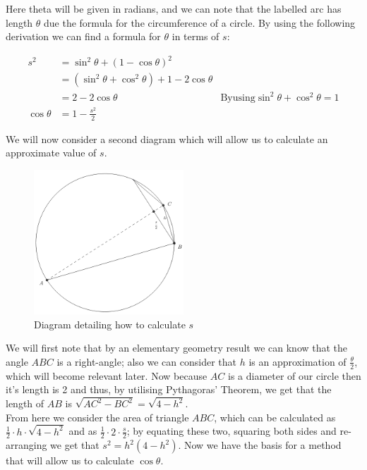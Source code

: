 Here theta will be given in radians, and we can note that the labelled arc has length \(\theta\) due the formula for the circumference of a circle. By using the following derivation we can find a formula for \(\theta\) in terms of \(s\):

\begin{displaymath}
\begin{align*}
	s^2 &= \sin^2\theta + (1 - \cos\theta)^2\\
	    &= (\sin^2\theta + \cos^2\theta) + 1 - 2\cos\theta\\
		&= 2 - 2 \cos\theta 
			&\mathrm{By using } \sin^2\theta + \cos^2\theta = 1\\
	\cos\theta &= 1 - \frac{s^2}{2}
\end{align*}
\end{displaymath}

We will now consider a second diagram which will allow us to calculate an approximate value of \(s\).

\begin{figure}[!ht]
	\label{FIG_"Geometric Trig 2"}
	\caption{Diagram detailing how to calculate \(s\)}
	\centering
	\includegraphics[width=0.5\textwidth]{"./Diagrams/Geometric Trig Diagram 2"}
\end{figure}

We will first note that by an elementary geometry result we can know that the angle \(ABC\) is a right-angle; also we can consider that \(h\) is an approximation of \(\tfrac{\theta}{2}\), which will become relevant later. Now because \(AC\) is a diameter of our circle then it's length is 2 and thus, by utilising Pythagoras' Theorem, we get that the length of \(AB\) is \(\sqrt{AC^2 - BC^2} = \sqrt{4 - h^2}\).\\

From here we consider the area of triangle \(ABC\), which can be calculated as \(\frac{1}{2}\cdot h\cdot\sqrt{4-h^2}\) and as \(\frac{1}{2}\cdot2\cdot\frac{s}{2}\); by equating these two, squaring both sides and re-arranging we get that \(s^2 = h^2(4 - h^2)\). Now we have the basis for a method that will allow us to calculate \(\cos\theta\).\\


